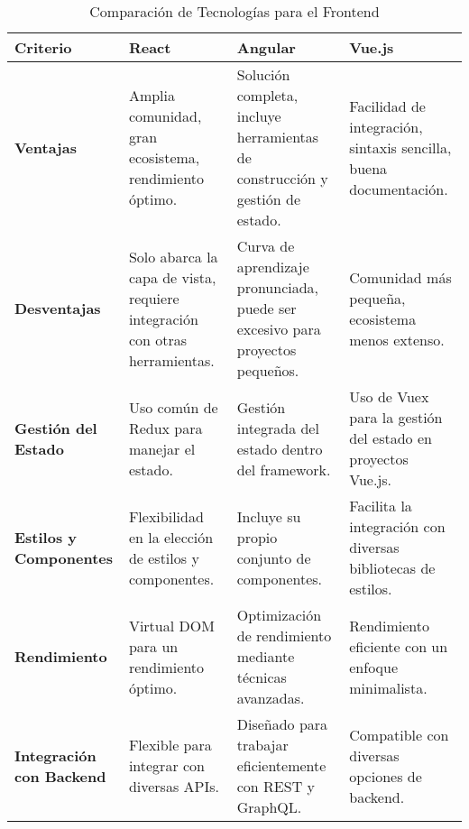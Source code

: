 \begin{table}[ht]
\centering
\begin{tabular}{ 
   >{\raggedright\arraybackslash}p{2.5cm} 
   >{\raggedright\arraybackslash}p{2.5cm} 
   >{\raggedright\arraybackslash}p{2.5cm} 
   >{\raggedright\arraybackslash}p{2.5cm} }
\toprule
\textbf{Criterio} & \textbf{React} & \textbf{Angular} & \textbf{Vue.js} \\
\midrule
\textbf{Ventajas} & Amplia comunidad, gran ecosistema, rendimiento óptimo. & Solución completa, incluye herramientas de construcción y gestión de estado. & Facilidad de integración, sintaxis sencilla, buena documentación. \\
\midrule
\textbf{Desventajas} & Solo abarca la capa de vista, requiere integración con otras herramientas. & Curva de aprendizaje pronunciada, puede ser excesivo para proyectos pequeños. & Comunidad más pequeña, ecosistema menos extenso. \\
\midrule
\textbf{Gestión del Estado} & Uso común de Redux para manejar el estado. & Gestión integrada del estado dentro del framework. & Uso de Vuex para la gestión del estado en proyectos Vue.js. \\
\midrule
\textbf{Estilos y Componentes} & Flexibilidad en la elección de estilos y componentes. & Incluye su propio conjunto de componentes. & Facilita la integración con diversas bibliotecas de estilos. \\
\midrule
\textbf{Rendimiento} & Virtual DOM para un rendimiento óptimo. & Optimización de rendimiento mediante técnicas avanzadas. & Rendimiento eficiente con un enfoque minimalista. \\
\midrule
\textbf{Integración con Backend} & Flexible para integrar con diversas APIs. & Diseñado para trabajar eficientemente con REST y GraphQL. & Compatible con diversas opciones de backend. \\
\bottomrule
\end{tabular}
\caption{Comparación de Tecnologías para el Frontend}
\label{tabla:comparacion_frontend}
\end{table}